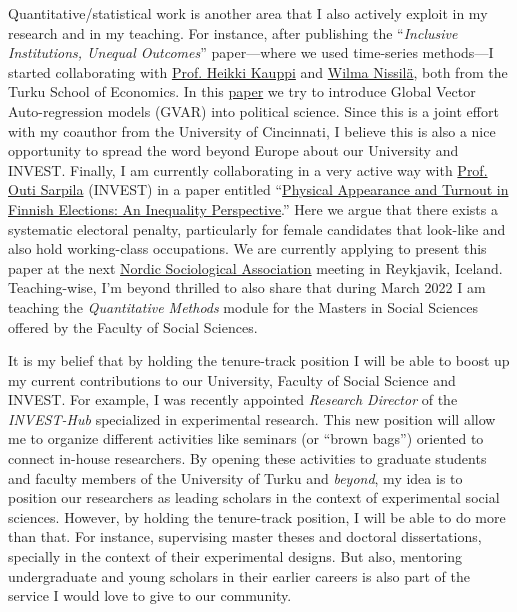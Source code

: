 \documentclass[10pt,stdletter,dateno,sigleft]{newlfm} %
\begin{document}
\begin{newlfm}
Quantitative/statistical work is another area that I also actively exploit in my research and in my teaching. For instance, after publishing the ``\emph{Inclusive Institutions, Unequal Outcomes}'' paper---where we used time-series methods---I started collaborating with \href{https://www.utu.fi/en/people/heikki-kauppi}{Prof. Heikki Kauppi} and \href{https://www.utu.fi/en/people/wilma-nissila}{Wilma Nissil{\"a}}, both from the Turku School of Economics. In this \href{https://github.com/hbahamonde/Bahamonde_Kovac/raw/master/abstract.txt}{paper} we try to introduce Global Vector Auto-regression models (GVAR) into political science. Since this is a joint effort with my coauthor from the University of Cincinnati, I believe this is also a nice opportunity to spread the word beyond Europe about our University and INVEST. Finally, I am currently collaborating in a very active way with \href{https://www.utu.fi/en/people/outi-sarpila}{Prof. Outi Sarpila} (INVEST) in a paper entitled ``\href{https://raw.githubusercontent.com/hbahamonde/Physical/main/abstract.rtf}{Physical Appearance and Turnout in Finnish Elections: An Inequality Perspective}.'' Here we argue that there exists a systematic electoral penalty, particularly for female candidates that look-like and also hold working-class occupations. We are currently applying to present this paper at the next \href{https://nsa2022.is}{Nordic Sociological Association} meeting in Reykjavik, Iceland. Teaching-wise, I'm beyond thrilled to also share that during March 2022 I am teaching the \emph{Quantitative Methods} module for the Masters in Social Sciences offered by the Faculty of Social Sciences. 

It is my belief that by holding the tenure-track position I will be able to boost up my current contributions to our University, Faculty of Social Science and INVEST. For example, I was recently appointed \emph{Research Director} of the \emph{INVEST-Hub} specialized in experimental research. This new position will allow me to organize different activities like seminars (or ``brown bags'') oriented to connect in-house researchers. By opening these activities to graduate students and faculty members of the University of Turku and \emph{beyond}, my idea is to position our researchers as leading scholars in the context of experimental social sciences. However, by holding the tenure-track position, I will be able to do more than that. For instance, supervising master theses and doctoral dissertations, specially in the context of their experimental designs. But also, mentoring undergraduate and young scholars in their earlier careers is also part of the service I would love to give to our community. 


\end{newlfm}
\end{document}
